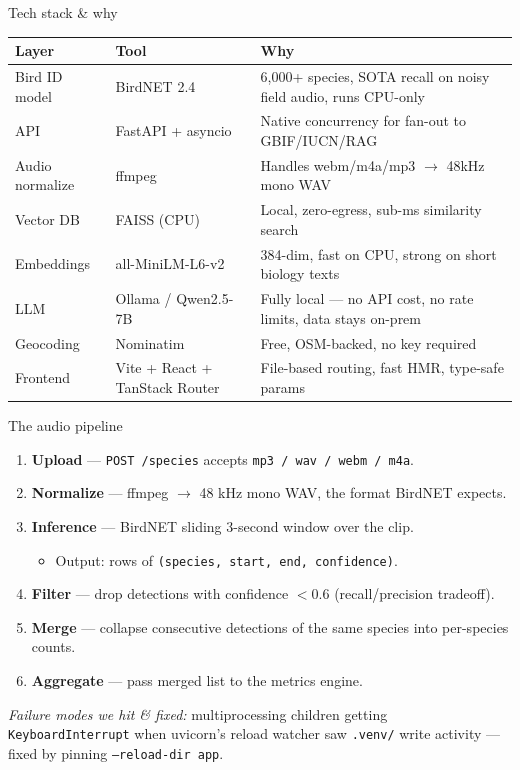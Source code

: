 \documentclass[aspectratio=169]{beamer}
\begin{document}
\begin{frame}{Tech stack \& why}
  \small
  \begin{tabular}{p{3.3cm}p{2.2cm}p{8.5cm}}
    \toprule
    \textbf{Layer} & \textbf{Tool} & \textbf{Why} \\
    \midrule
    Bird ID model        & BirdNET 2.4       & 6{,}000+ species, SOTA recall on noisy field audio, runs CPU-only \\
    API                  & FastAPI + asyncio & Native concurrency for fan-out to GBIF/IUCN/RAG \\
    Audio normalize      & ffmpeg            & Handles webm/m4a/mp3 $\rightarrow$ 48kHz mono WAV \\
    Vector DB            & FAISS (CPU)       & Local, zero-egress, sub-ms similarity search \\
    Embeddings           & all-MiniLM-L6-v2  & 384-dim, fast on CPU, strong on short biology texts \\
    LLM                  & Ollama / Qwen2.5-7B & Fully local --- no API cost, no rate limits, data stays on-prem \\
    Geocoding            & Nominatim         & Free, OSM-backed, no key required \\
    Frontend             & Vite + React + TanStack Router & File-based routing, fast HMR, type-safe params \\
    \bottomrule
  \end{tabular}
\end{frame}

\begin{frame}{The audio pipeline}
  \begin{enumerate}
    \item \textbf{Upload} --- \texttt{POST /species} accepts \texttt{mp3 / wav / webm / m4a}.
    \item \textbf{Normalize} --- ffmpeg $\rightarrow$ 48 kHz mono WAV, the format BirdNET expects.
    \item \textbf{Inference} --- BirdNET sliding 3-second window over the clip.
      \begin{itemize}
        \item Output: rows of \texttt{(species, start, end, confidence)}.
      \end{itemize}
    \item \textbf{Filter} --- drop detections with confidence $< 0.6$ (recall/precision tradeoff).
    \item \textbf{Merge} --- collapse consecutive detections of the same species into per-species counts.
    \item \textbf{Aggregate} --- pass merged list to the metrics engine.
  \end{enumerate}
  \vspace{0.4em}
  \footnotesize\textit{Failure modes we hit \& fixed:} multiprocessing children getting \texttt{KeyboardInterrupt} when uvicorn's reload watcher saw \texttt{.venv/} write activity --- fixed by pinning \texttt{--reload-dir app}.
\end{frame}
\end{document}

